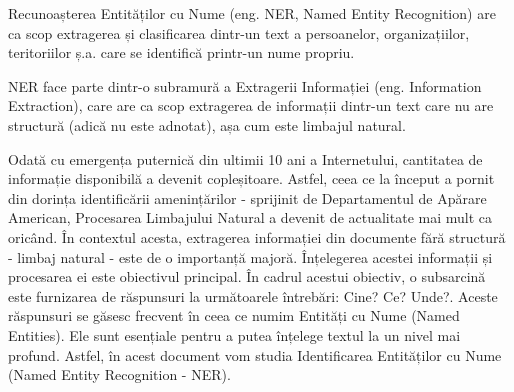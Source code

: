 
Recunoașterea Entităților cu Nume (eng. NER, Named Entity Recognition) are ca scop extragerea și clasificarea dintr-un text a persoanelor, organizațiilor, teritoriilor ș.a. care se identifică printr-un nume propriu.

NER face parte dintr-o subramură a Extragerii Informației (eng. Information Extraction), care are ca scop extragerea de informații dintr-un text care nu are structură (adică nu este adnotat), așa cum este limbajul natural.

Odată cu emergența puternică din ultimii 10 ani a Internetului, cantitatea de informație disponibilă a devenit copleșitoare. Astfel, ceea ce la început a pornit din dorința identificării amenințărilor - sprijinit de Departamentul de Apărare American, Procesarea Limbajului Natural a devenit de actualitate mai mult ca oricând. În contextul acesta, extragerea informației din documente fără structură - limbaj natural - este de o importanță majoră. Înțelegerea acestei informații și procesarea ei este obiectivul principal. În cadrul acestui obiectiv, o subsarcină este furnizarea de răspunsuri la următoarele întrebări: Cine? Ce? Unde?. Aceste răspunsuri se găsesc frecvent în ceea ce numim Entități cu Nume (Named Entities). Ele sunt esențiale pentru a putea înțelege textul la un nivel mai profund. Astfel, în acest document vom studia Identificarea Entităților cu Nume (Named Entity Recognition - NER).

